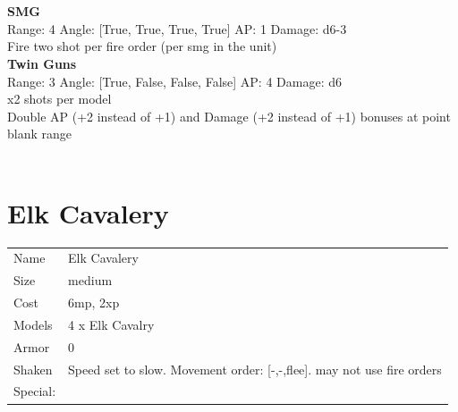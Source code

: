 \ \\

\ \\
{\bf SMG } \\



Range: 4  Angle: [True, True, True, True] AP: 1 Damage: d6-3 \\
Fire two shot per fire order (per smg in the unit)\\ 




{\bf Twin Guns } \\



Range: 3  Angle: [True, False, False, False] AP: 4 Damage: d6 \\
x2 shots per model\\ 
Double AP (+2 instead of +1) and Damage (+2 instead of +1) bonuses at point blank range\\ 




 
\ \\













\clearpage

\section{ Elk Cavalery }

\begin{tabular}{ll}
  Name & Elk Cavalery \\
  Size & medium\\
  Cost & 6mp, 2xp\\
  Models & 4 x Elk Cavalry\\
  Armor & 0\\
  Shaken & Speed set to slow. Movement order: [-,-,flee]. may not use fire orders\\
  Special: \\
\end{tabular}

\noindent 

